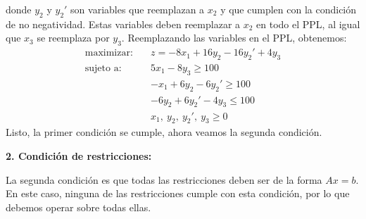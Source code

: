 \noindent donde \(y_2\) y \(y_2'\) son variables que reemplazan a \(x_2\) y que cumplen con la condición de no negatividad. Estas variables deben reemplazar a \(x_2\) en todo el PPL, al igual que \(x_3\) se reemplaza por \(y_3\). Reemplazando las variables en el PPL, obtenemos:
\begin{align*}
  \text{maximizar:} \quad   &z = -8x_1 + 16y_2 - 16y_2' + 4y_3 \\[3pt]
  \text{sujeto a:} \quad    &5x_1 - 8y_3 \geq 100 \\
                            &-x_1 + 6y_2 - 6y_2' \geq 100 \\
                            &-6y_2 + 6y_2' - 4y_3 \leq 100 \\
                            &x_1,\ y_2,\ y_2',\ y_3 \geq 0
\end{align*}
Listo, la primer condición se cumple, ahora veamos la segunda condición.

\noindent\textbf{2. Condición de restricciones:}

La segunda condición es que todas las restricciones deben ser de la forma \(Ax = b\). En este caso, ninguna de las restricciones cumple con esta condición, por lo que debemos operar sobre todas ellas. 

